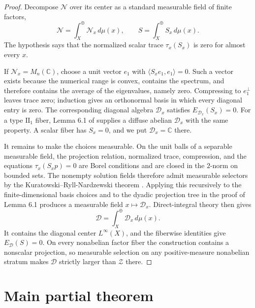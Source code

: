 \documentclass[11pt]{article}
\newcommand{\N}{\mathcal N}
\newcommand{\Z}{\mathcal Z}
\newcommand{\D}{\mathcal D}
\newcommand{\C}{\mathbb C}
\begin{document}
\begin{proof}
Decompose $\N$ over its center as a standard measurable field of finite
factors,
\[
  \N=\int_X^{\oplus}\N_x\,d\mu(x),
  \qquad S=\int_X^{\oplus}S_x\,d\mu(x).
\]
The hypothesis says that the normalized scalar trace $\tau_x(S_x)$ is zero
for almost every $x$.

If $\N_x=M_n(\C)$, choose a unit vector $e_1$ with
$\langle S_xe_1,e_1\rangle=0$. Such a vector exists because the numerical
range is convex, contains the spectrum, and therefore contains the average of
the eigenvalues, namely zero. Compressing to $e_1^\perp$ leaves trace zero;
induction gives an orthonormal basis in which every diagonal entry is zero.
The corresponding diagonal algebra $\D_x$ satisfies $E_{\D_x}(S_x)=0$.
For a type $\mathrm{II}_1$ fiber, Lemma 6.1 of \cite{DS} supplies a diffuse
abelian $\D_x$ with the same property. A scalar fiber has $S_x=0$, and we put
$\D_x=\C$ there.

It remains to make the choices measurable. On the unit balls of a separable
measurable field, the projection relation, normalized trace, compression, and
the equations $\tau_x(S_xp)=0$ are Borel conditions and are closed in the
$2$-norm on bounded sets. The nonempty solution fields therefore admit
measurable selectors by the Kuratowski--Ryll-Nardzewski theorem
\cite{KRN}. Applying this recursively to the finite-dimensional basis choices
and to the dyadic projection tree in the proof of Lemma 6.1 produces a
measurable field $x\mapsto\D_x$. Direct-integral theory \cite{Tak} then gives
\[
 \D=\int_X^{\oplus}\D_x\,d\mu(x).
\]
It contains the diagonal center $L^\infty(X)$, and the fiberwise identities
give $E_{\D}(S)=0$. On every nonabelian factor fiber the construction contains
a nonscalar projection, so measurable selection on any positive-measure
nonabelian stratum makes $\D$ strictly larger than $\Z$ there.
\end{proof}

\section{Main partial theorem}
\end{document}
